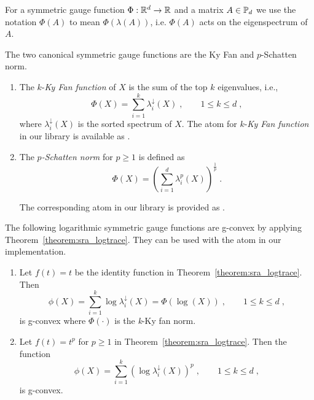 \documentclass[twoside,11pt]{article}
\begin{document}
\begin{remark}
    For a symmetric gauge function $\Phi: \mathbb{R}^d \to \mathbb{R}$ and a matrix $A \in \mathbb{P}_d$ we use the notation $\Phi(A)$ to mean $\Phi(\lambda(A))$, i.e. $\Phi(A)$ acts on the eigenspectrum of $A$.
\end{remark}

\begin{example}
    The two canonical symmetric gauge functions are the Ky Fan and $p$-Schatten norm.
    \begin{enumerate}
        \item The $k$-\emph{Ky Fan function} of $X$ is the sum of the top $k$ eigenvalues, i.e., 
        \[
        \Phi(X) = \sum_{i=1}^k \lambda_i^\downarrow(X) \; , \qquad 1 \leq k \leq d \; ,
        \]
        where $\lambda_i^\downarrow(X)$ is the sorted spectrum of $X$. The atom for $k$-\emph{Ky Fan function} in our library is available as . 
        \item The \emph{$p$-Schatten norm} for $p \geq 1$ is defined as 
        \[
        \Phi(X) = \left(\sum_{i=1}^d \lambda^p_i(X)\right)^{\frac{1}{p}} \; .
        \]

        The corresponding atom in our library is provided as .
    \end{enumerate}
\end{example}



\begin{example}
    The following logarithmic symmetric gauge functions are g-convex by applying Theorem~\ref{theorem:sra_logtrace}. They can be used with the  atom in our implementation.
    \begin{enumerate}
        \item Let $f(t) = t$ be the identity function in Theorem~\ref{theorem:sra_logtrace}. Then 
        \[
        \phi(X) = \sum_{i=1}^k \log \lambda_i^\downarrow(X) = \Phi(\log(X)) \; , \qquad 1 \leq k \leq d \; ,
        \]
    is g-convex where $\Phi(\cdot)$ is the \textit{k}-Ky fan norm. 
    \item Let $f(t) = t^p$ for $p \geq 1$ in Theorem~\ref{theorem:sra_logtrace}. Then the function
    \[
    \phi(X) = \sum_{i=1}^k \left(\log \lambda^\downarrow_i(X)\right)^p \; , \qquad 1 \leq k \leq d \; ,
    \]
    is g-convex. 
    \end{enumerate}

\end{example}
\end{document}
